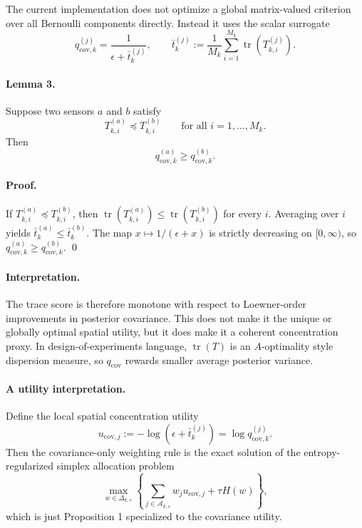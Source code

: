 The current implementation does not optimize a global matrix-valued criterion over all Bernoulli components directly. Instead it uses the scalar surrogate
\begin{equation}
q_{\mathrm{cov},k}^{(j)}
=
\frac{1}{\epsilon + \bar t_{k}^{(j)}},
\qquad
\bar t_{k}^{(j)} := \frac{1}{M_k}\sum_{i=1}^{M_k}\operatorname{tr}(T_{k,i}^{(j)}).
\end{equation}

\paragraph{Lemma 3.}
Suppose two sensors $a$ and $b$ satisfy
\begin{equation}
T_{k,i}^{(a)} \preceq T_{k,i}^{(b)}
\qquad
\text{for all } i=1,\ldots,M_k.
\end{equation}
Then
\begin{equation}
q_{\mathrm{cov},k}^{(a)} \ge q_{\mathrm{cov},k}^{(b)}.
\end{equation}

\paragraph{Proof.}
If $T_{k,i}^{(a)} \preceq T_{k,i}^{(b)}$, then $\operatorname{tr}(T_{k,i}^{(a)}) \le \operatorname{tr}(T_{k,i}^{(b)})$ for every $i$. Averaging over $i$ yields $\bar t_k^{(a)} \le \bar t_k^{(b)}$. The map $x \mapsto 1/(\epsilon+x)$ is strictly decreasing on $[0,\infty)$, so $q_{\mathrm{cov},k}^{(a)} \ge q_{\mathrm{cov},k}^{(b)}$. \qed

\paragraph{Interpretation.}
The trace score is therefore monotone with respect to Loewner-order improvements in posterior covariance. This does not make it the unique or globally optimal spatial utility, but it does make it a coherent concentration proxy. In design-of-experiments language, $\operatorname{tr}(T)$ is an $A$-optimality style dispersion measure, so $q_{\mathrm{cov}}$ rewards smaller average posterior variance.

\paragraph{A utility interpretation.}
Define the local spatial concentration utility
\begin{equation}
u_{\mathrm{cov},j} := -\log\!\left(\epsilon + \bar t_k^{(j)}\right) = \log q_{\mathrm{cov},k}^{(j)}.
\end{equation}
Then the covariance-only weighting rule is the exact solution of the entropy-regularized simplex allocation problem
\begin{equation}
\max_{w \in \Delta_{k,s}}
\left\{
\sum_{j \in \mathcal{A}_{k,s}} w_j u_{\mathrm{cov},j}
+
\tau H(w)
\right\},
\end{equation}
which is just Proposition 1 specialized to the covariance utility.

